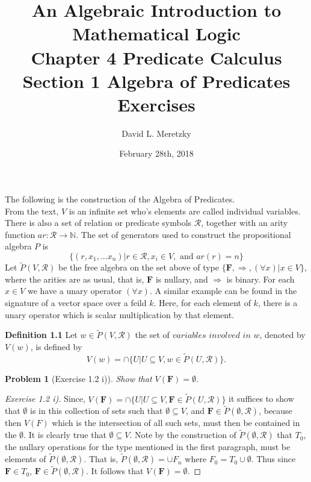 \documentclass{article}
\title{ \vspace{-10ex} %
An Algebraic Introduction to Mathematical Logic\\
Chapter 4 Predicate Calculus \\
Section 1 Algebra of Predicates \\
Exercises 
}
\author{David L. Meretzky
}
\date{%
February 28th, 2018
}
\theoremstyle{problemstyle}
\newtheorem{problem}{Problem}
\begin{document}
\maketitle




The following is the construction of the Algebra of Predicates.\\

From the text, $V$ is an infinite set who's elements are called individual variables. There is also a set of relation or predicate symbols $\mathscr{R}$, together with an arity function $ar:\mathscr{R}\rightarrow \mathbb{N}$.  The set of generators used to construct the propositional algebra $P$ is $$\{(r,x_1,...x_n)|r \in \mathscr{R}, x_i \in V, \text{ and }ar(r) = n\}$$ Let $\widetilde{P}(V,\mathscr{R})$ be the free algebra on the set above of type $\{\textbf{F}, \Rightarrow,(\forall x)|x \in V\}$, where the arities are as usual, that is, $\textbf{F}$ is nullary, and $\Rightarrow$ is binary.  For each $x \in V$ we have a unary operator $(\forall x)$. A similar example can be found in the signature of a vector space over a feild $k$. Here, for each element of $k$, there is a unary operator which is scalar multiplication by that element. 

\begin{flushleft}
\textbf{Definition 1.1} Let $w \in \widetilde{P}(V,\mathscr{R})$ the set of $variables$ $involved$ $in$ $w$, denoted by $V(w)$, is defined by $$V(w) = \cap\{U|U \subseteq V, w\in \widetilde{P}(U,\mathscr{R})\}.$$
\end{flushleft}

\begin{problem}[Exercise 1.2 i)] 
Show that $V(\textbf{F}) = \emptyset$.
\end{problem}

\begin{proof}[Exercise 1.2 i)]
Since, $V(\textbf{F}) = \cap\{U|U \subseteq V, \textbf{F} \in \widetilde{P}(U,\mathscr{R})\}$ it suffices to show that $\emptyset$ is in this collection of sets such that $\emptyset \subseteq V$, and $\textbf{F} \in \widetilde{P}(\emptyset,\mathscr{R})$, because then $V(F)$ which is the intersection of all such sets, must then be contained in the $\emptyset$. It is clearly true that $\emptyset \subseteq V$. Note by the construction of $\widetilde{P}(\emptyset,\mathscr{R})$ that $T_0$, the nullary operations for the type mentioned in the first paragraph, must be elements of $\widetilde{P}(\emptyset,\mathscr{R})$. That is, $\widetilde{P}(\emptyset,\mathscr{R}) = \cup F_n$ where $F_0 = T_0 \cup \emptyset$. Thus since $\textbf{F} \in T_0$, $\textbf{F} \in \widetilde{P}(\emptyset,\mathscr{R})$. It follows that $V(\textbf{F}) = \emptyset$.
\end{proof}
\end{document}
